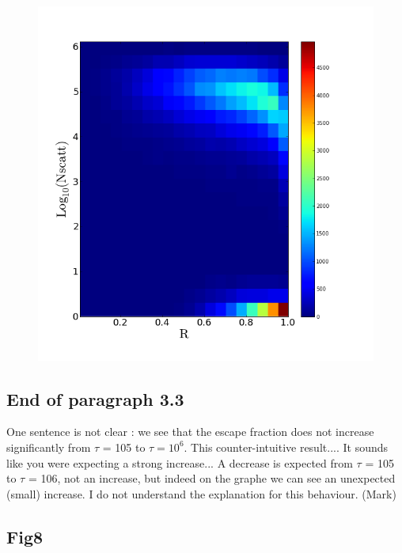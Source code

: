 \documentclass[12pt]{article}
\begin{document}
\begin{figure}
\includegraphics[scale=0.4]{Histogram2dNscattVSRadius.png}
\end{figure}


\subsection*{End of paragraph 3.3}

One sentence is not clear : we see that the escape fraction does not increase significantly from $\tau$ = 105 to $\tau = 10^{6}$. This counter-intuitive result.... It sounds like you were expecting a strong increase... A decrease is expected from $\tau$ = 105 to $\tau$ = 106, not an increase, but indeed on the graphe we can see an unexpected (small) increase. I do not understand the explanation for this behaviour.
(Mark)

\subsection*{Fig8}
\end{document}
